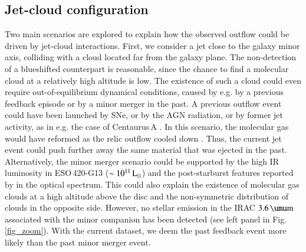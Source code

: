 \documentclass[longauth]{aa}
\def\micron{\hbox{$\umu$m}}
\begin{document}
\subsection{Jet-cloud configuration}\label{scenarios}
Two main scenarios are explored to explain how the observed outflow could be driven by jet-cloud interactions. First, we consider a jet close to the galaxy minor axis, colliding with a cloud located far from the galaxy plane. The non-detection of a blueshifted counterpart is reasonable, since the chance to find a molecular cloud at a relatively high altitude is low. The existence of such a cloud could even require out-of-equilibrium dynamical conditions, caused by e.g. by a previous feedback episode or by a minor merger in the past. A previous outflow event could have been launched by SNe, or by the AGN radiation, or by former jet activity, as in e.g. the case of Centaurus\,A . In this scenario, the molecular gas would have reformed as the relic outflow cooled down . Thus, the current jet event could push further away the same material that was ejected in the past. Alternatively, the minor merger scenario could be supported by the high IR luminosity in \mbox{ESO\,420-G13} ($\sim 10^{11}\, \rm{L_\odot}$) and the post-starburst features reported by  in the optical spectrum. This could also explain the existence of molecular gas clouds at a high altitude above the disc and the non-symmetric distribution of clouds in the opposite side. However, no stellar emission in the IRAC $3.6\, \rm{\micron}$ associated with the minor companion has been detected (see left panel in Fig.\,\ref{fig_zoom}). With the current dataset, we deem the past feedback event more likely than the past minor merger event.
\end{document}
